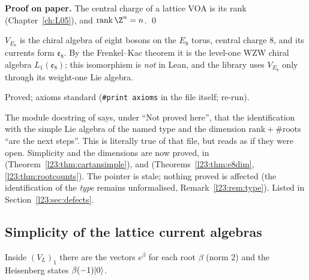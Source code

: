 \textbf{Proof on paper.} The central charge of a lattice VOA is its rank (Chapter~\ref{ch:L05}), and $\mathrm{rank}\,\Z^n=n$. \qed

\begin{physics}
$V_{E_8}$ is the chiral algebra of eight bosons on the $E_8$ torus, central charge $8$, and its currents form $\mathfrak e_8$. By the
Frenkel--Kac theorem it is the level-one WZW chiral algebra $L_1(\mathfrak e_8)$; this isomorphism is \emph{not} in Lean, and the
library uses $V_{E_8}$ only through its weight-one Lie algebra.
\end{physics}

\begin{status}
Proved; axioms standard (\texttt{\#print axioms} in the file itself;  re-run).
\end{status}

\begin{warning}[title={Trap: stale docstring in \texttt{DeligneLatticeLie.lean}}]\label{l23:warn:stalelattice}
The module docstring of  says, under ``Not proved here'', that the
identification with the simple Lie algebra of the named type and the dimension $\mathrm{rank}+\#\text{roots}$ ``are the next steps''. This is
literally true of that file, but reads as if they were open. Simplicity and the dimensions are now proved, in  (Theorem~\ref{l23:thm:cartansimple}),
 and  (Theorems~\ref{l23:thm:e8dim}, \ref{l23:thm:rootcounts}). The pointer is stale;
nothing proved is affected (the identification of the \emph{type} remains unformalised, Remark~\ref{l23:rem:type}). Listed in
Section~\ref{l23:sec:defects}.
\end{warning}

\subsection{Simplicity of the lattice current algebras}

Inside $(V_L)_1$ there are the vectors $e^\beta$ for each root $\beta$ (norm $2$) and the Heisenberg states $\beta(-1)|0\rangle$.

